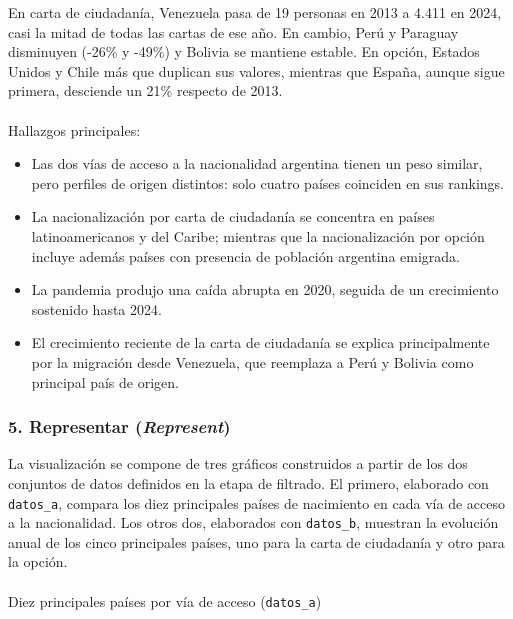 \documentclass[
  letterpaper,
  DIV=11,
  numbers=noendperiod]{scrartcl}
\makeatletter
\let\oldparagraph\paragraph
\renewcommand{\paragraph}{
    \@ifstar
      \xxxParagraphStar
      \xxxParagraphNoStar
  }
\newcommand{\xxxParagraphStar}[1]{\oldparagraph*{#1}\mbox{}}
\newcommand{\xxxParagraphNoStar}[1]{\oldparagraph{#1}\mbox{}}
\makeatother
\begin{document}
En carta de ciudadanía, Venezuela pasa de 19 personas en 2013 a 4.411 en
2024, casi la mitad de todas las cartas de ese año. En cambio, Perú y
Paraguay disminuyen (-26\% y -49\%) y Bolivia se mantiene estable. En
opción, Estados Unidos y Chile más que duplican sus valores, mientras
que España, aunque sigue primera, desciende un 21\% respecto de 2013.

\paragraph{Hallazgos principales:}\label{hallazgos-principales}

\begin{itemize}
\item
  Las dos vías de acceso a la nacionalidad argentina tienen un peso
  similar, pero perfiles de origen distintos: solo cuatro países
  coinciden en sus rankings.
\item
  La nacionalización por carta de ciudadanía se concentra en países
  latinoamericanos y del Caribe; mientras que la nacionalización por
  opción incluye además países con presencia de población argentina
  emigrada.
\item
  La pandemia produjo una caída abrupta en 2020, seguida de un
  crecimiento sostenido hasta 2024.
\item
  El crecimiento reciente de la carta de ciudadanía se explica
  principalmente por la migración desde Venezuela, que reemplaza a Perú
  y Bolivia como principal país de origen.
\end{itemize}

\subsubsection{\texorpdfstring{5. Representar
(\emph{Represent})}{5. Representar (Represent)}}\label{representar-represent}

La visualización se compone de tres gráficos construidos a partir de los
dos conjuntos de datos definidos en la etapa de filtrado. El primero,
elaborado con \texttt{datos\_a}, compara los diez principales países de
nacimiento en cada vía de acceso a la nacionalidad. Los otros dos,
elaborados con \texttt{datos\_b}, muestran la evolución anual de los
cinco principales países, uno para la carta de ciudadanía y otro para la
opción.

\paragraph{\texorpdfstring{Diez principales países por vía de acceso
(\texttt{datos\_a})}{Diez principales países por vía de acceso (datos\_a)}}\label{diez-principales-pauxedses-por-vuxeda-de-acceso-datos_a}
\end{document}
